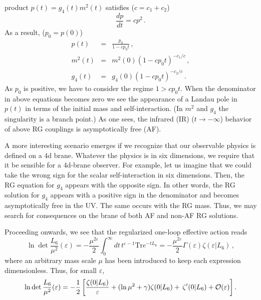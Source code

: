 \documentclass[a4paper,aps,prl,preprint,groupedaddress,showpacs,nobibnotes,tightenlines]{revtex4}
\begin{document}
product $p(t)=g_4(t)m^2(t)$ satisfies ($c=c_1+c_2$)
\begin{equation}
\frac{d p}{dt}=cp^2\,.
\end{equation}
As a result, ($p_0=p(0)$)
\begin{subequations}
\begin{eqnarray}
p(t)&=&\frac{p_0}{1-cp_0 t}\,,
\label{p}\\
m^2(t)&=&m^2(0)(1-cp_0 t)^{-c_1/c}\,,
\label{m}
\\
g_4(t)&=&g_4(0)(1-cp_0 t)^{-c_2/c} \,.
\label{g}
\end{eqnarray}
 \end{subequations}
 As  $p_0$ is positive, we have to consider the regime 
$1 >cp_0 t$. When the denominator in above equations becomes zero
we see the appearance 
of a Landau pole in $p(t)$ in terms of the initial mass and self-interaction.
(In $m^2$ and $g_4$ the singularity is a branch point.)
As one sees, the infrared (IR) ($t\to-\infty$) behavior 
of above RG couplings is asymptotically free (AF).

A more interesting scenario emerges if we recognize that 
our observable physics is defined on a 4d brane.
Whatever the physics is in six dimensions, we require that it
be sensible for a 4d-brane observer.
For example, let us imagine that we could take the wrong sign for 
the scalar self-interaction
in six dimensions. Then, the RG equation for $g_4$ appears with the 
opposite sign.
In other words, the RG solution for $g_4$ appears with a positive
 sign in the denominator
 and becomes asymptotically free in the UV. The same occurs with the RG mass.
 Thus, we may search for consequences on the brane
of both AF and non-AF RG solutions.

Proceeding onwards, we see that the regularized one-loop effective action reads
\begin{equation}
\ln \det \frac{L_6}{\mu^2}(\varepsilon)=-\frac{\mu^{2\varepsilon}}{2}
\int_0^\infty dt\,t^{\varepsilon-1}
\mbox{Tr}e^{-tL_6}=- \frac{\mu^{2\varepsilon}}{2}
\Gamma(\varepsilon)\zeta(\varepsilon|L_6)\,,
\end{equation}
where an arbitrary mass scale $\mu$ has been introduced to keep each expression
dimensionless.
Thus, for small $\varepsilon$, 
\begin{equation}
\ln \det \frac{L_6}{\mu^2}(\varepsilon)=- \frac{1}{2}\left[
\frac{\zeta(0|L_6)}{\varepsilon}+(\ln \mu^2+\gamma)\zeta(0|L_6)+\,
\zeta'(0|L_6)+{\cal O}(\varepsilon)\right].
\end{equation}
\end{document}
